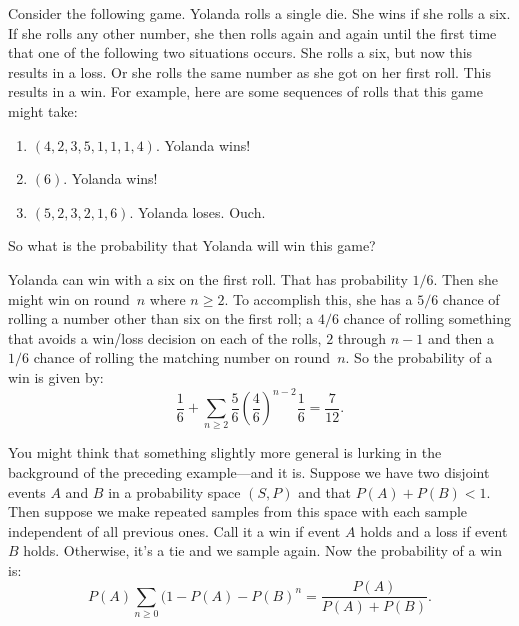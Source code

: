 \begin{example}
Consider the following game.  Yolanda rolls a single die.  She wins
if she rolls a six.  If she rolls any other number, she then rolls
again and again until the first time that one of the following two 
situations occurs.  She rolls a six, but now this results in a loss.
Or she rolls the same number as she got on her first roll. This results in a win.
For example, here are some sequences of rolls that this game might
take:
\begin{enumerate}
\item $(4,2,3,5,1,1,1,4)$.  Yolanda wins!
\item $(6)$.  Yolanda wins!
\item $(5,2, 3,2,1,6)$. Yolanda loses. Ouch.
\end{enumerate}
So what is the probability that Yolanda will win this game?

Yolanda can win with a six on the first roll.  That has probability $1/6$.
Then she might win on round~$n$ where $n\ge2$.  To accomplish this, she
has a $5/6$ chance of rolling a number other than six on the first roll;
a $4/6$ chance of rolling something that avoids a win/loss decision on
each of the rolls, $2$ through $n-1$ and then a $1/6$ chance of rolling
the matching number on round~$n$.
So the probability of a win is given by:
\[
 \frac{1}{6}+\sum_{n\ge 2}\frac{5}{6}(\frac{4}{6})^{n-2}\frac{1}{6} = \frac{7}{12}.
\]

\end{example}
\begin{example}
You might think that something slightly more general is lurking
in the background of the preceding example---and it is.  Suppose we
have two disjoint events $A$ and $B$ in a probability space $(S,P)$ and
that $P(A)+P(B)<1$.  Then suppose
we make repeated samples from this space with each sample independent
of all previous ones.  Call it a win if event $A$ holds and a loss if
event $B$ holds.  Otherwise, it's a tie and we sample again.  Now the
probability of a win is:
\[
P(A)\sum_{n\ge0}(1-P(A)-P(B)^n=\frac{P(A)}{P(A)+P(B)}.
\]
\end{example}

